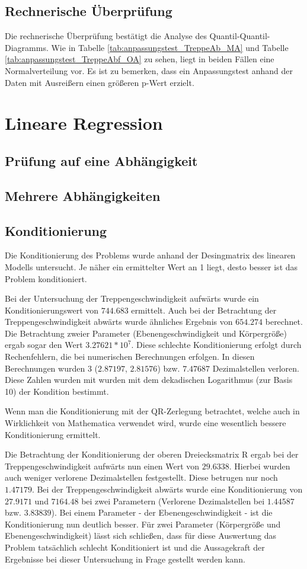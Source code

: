 	
	
	
	\subsection{Rechnerische Überprüfung}
	Die rechnerische Überprüfung bestätigt die Analyse des Quantil-Quantil-Diagramms. Wie in Tabelle \ref{tab:anpassungstest_TreppeAb_MA} und Tabelle \ref{tab:anpassungstest_TreppeAbf_OA} zu sehen, liegt in beiden Fällen eine Normalverteilung vor. Es ist zu bemerken, dass ein Anpassungstest anhand der Daten mit Ausreißern einen größeren p-Wert erzielt. 
	
	
	\section{Lineare Regression}
	\subsection{Prüfung auf eine Abhängigkeit}
	\subsection{Mehrere Abhängigkeiten}
	\subsection{Konditionierung}
	Die Konditionierung des Problems wurde anhand der Desingmatrix des linearen Modells untersucht. Je näher ein ermittelter Wert an 1 liegt, desto besser ist das Problem konditioniert.
	
	Bei der Untersuchung der Treppengeschwindigkeit aufwärts wurde ein Konditionierungswert von $744.683$ ermittelt. Auch bei der Betrachtung der Treppengeschwindigkeit abwärts wurde ähnliches Ergebnis von $654.274$ berechnet. Die Betrachtung zweier Parameter (Ebenengeschwindigkeit und Körpergröße) ergab sogar den Wert $3.27621*10^7$.
	Diese schlechte Konditionierung erfolgt durch Rechenfehlern, die bei numerischen Berechnungen erfolgen. In diesen Berechnungen wurden 3 ($2.87197$, $2.81576$) bzw. $7.47687$ Dezimalstellen verloren. Diese Zahlen wurden mit wurden mit dem dekadischen Logarithmus (zur Basis 10) der Kondition bestimmt.
	
	Wenn man die Konditionierung mit der QR-Zerlegung betrachtet, welche auch in Wirklichkeit von Mathematica verwendet wird, wurde eine wesentlich bessere Konditionierung ermittelt.
	
	Die Betrachtung der Konditionierung der oberen Dreiecksmatrix R ergab bei der Treppengeschwindigkeit aufwärts nun einen Wert von $29.6338$. Hierbei wurden auch weniger verlorene Dezimalstellen festgestellt. Diese betrugen nur noch $1.47179$. Bei der Treppengeschwindigkeit abwärts wurde eine Konditionierung von $27.9171$ und $7164.48$ bei zwei Parametern (Verlorene Dezimalstellen bei $1.44587$ bzw. $3.83839$). Bei einem Parameter - der Ebenengeschwindigkeit - ist die Konditionierung nun deutlich besser. Für zwei Parameter (Körpergröße und Ebenengeschwindigkeit) lässt sich schließen, dass für diese Auswertung das Problem tatsächlich schlecht Konditioniert ist und die Aussagekraft der Ergebnisse bei dieser Untersuchung in Frage gestellt werden kann.
	
